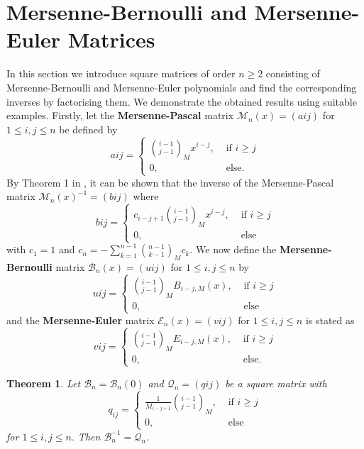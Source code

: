 \documentclass[12pt, a4paper]{article}
\newtheorem{theorem}{Theorem}[section]
\begin{document}
\section{Mersenne-Bernoulli and Mersenne-Euler Matrices}
In this section we introduce square matrices of order $n\geq 2$ consisting of Mersenne-Bernoulli and Mersenne-Euler polynomials and find the corresponding inverses by factorising them. We demonstrate the obtained results using suitable examples.
Firstly, let the \textbf{Mersenne-Pascal} matrix $\mathcal{M}_n(x) = (a{ij})$ for $1\leq i, j \leq n$ be defined by
\begin{equation}
a{ij} = \begin{cases}
\binom{i-1}{j-1}_Mx^{i-j}, &\text{~if~} i \geq j\\
0, &\text{~else.}
\end{cases}
\end{equation}
By Theorem 1 in \cite{KT}, it can be shown that the inverse of the Mersenne-Pascal matrix $\mathcal{M}_n(x)^{-1} = (b{ij})$ where
\begin{equation}
b{ij} = \begin{cases}
c_{i-j+1}\binom{i-1}{j-1}_Mx^{i-j}, &\text{~if~} i \geq j\\
0, &\text{~else}
\end{cases}
\end{equation}
with $c_1 = 1$ and $c_n = -\sum_{k=1}^{n-1}\binom{n-1}{k-1}_Mc_k.$
We now define the \textbf{Mersenne-Bernoulli} matrix $\mathcal{B}_n(x)=(u{ij})$ for $1 \leq i,j \leq n$ by
\begin{equation}
u{ij} = \begin{cases}
\binom{i-1}{j-1}_MB_{i-j,M}(x), &\text{~if~} i \geq j\\
0, &\text{~else}
\end{cases}
\end{equation}
and the \textbf{Mersenne-Euler} matrix $\mathcal{E}_n(x) = (v{ij})$
for $1 \leq i,j \leq n$ is stated as 
\begin{equation}
v{ij} = \begin{cases}
\binom{i-1}{j-1}_ME_{i-j,M}(x), &\text{~if~} i \geq j\\
0, &\text{~else.}
\end{cases}
\end{equation}
\begin{theorem}
Let $\mathcal{B}_n = \mathcal{B}_n(0)$ and
$\mathcal{Q}_n = (q{ij})$ be a square matrix with
\[q_{ij} = \begin{cases}
\frac{1}{M_{i-j+1}}\binom{i-1}{j-1}_M, &\text{~if~} i \geq j\\
0, &\text{~else}
\end{cases}\]
for $1 \leq i,j \leq n.$ Then $\mathcal{B}_n^{-1} = \mathcal{Q}_n.$
\end{theorem}
\end{document}
